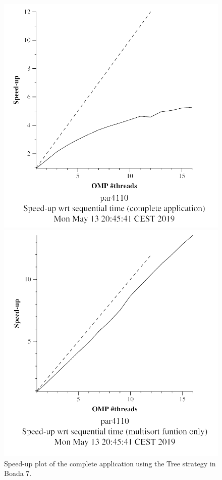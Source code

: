 \documentclass[12pt, a4paper]{article}
\begin{document}
\begin{figure}[H]
\centering
\begin{minipage}[b]{0.4\linewidth}
  \centering
  \includegraphics[scale=0.5]{./S2/multisort-omp-strong_boada-7_tree_complete_application}
  \caption{Speed-up plot of the complete application using the Tree strategy in Boada 7.}
  \label{fig:mandel-omp-10000-strong-21-time}
\end{minipage}%
\hspace{0.5cm}
\begin{minipage}[b]{0.4\linewidth}
  \centering
  \includegraphics[scale=0.5]{./S2/multisort-omp-strong_boada-7_tree_multisort_only}

\end{minipage}
\end{figure}
\end{document}

